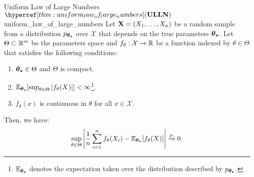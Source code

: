 \begin{theorem}{Uniform Law of Large Numbers $\ULLN$}{uniform_law_of_large_numbers}
    Let ${\bf X}=(X_1, \dots, X_n)$ be a random sample from a distribution $p_{\boldsymbol{\theta_*}}$ over $\mathcal{X}$ that depends on the true parameters $\boldsymbol{\theta_*}$. Let $\Theta\subset\mathbb{R}^m$ be the parameters space and $f_\theta:\mathcal{X}\to\mathbb{R}$ be a function indexed by $\theta\in\Theta$ that satisfies the following conditions:
    \begin{enumerate}
        \item $\boldsymbol{\theta_*}\in\Theta$ and $\Theta$ is compact.
        \item $\mathbb{E}_{\boldsymbol{\theta_*}}[\sup_{\theta\in\Theta}|f_\theta(X)|] < \infty$\footnote{$\mathbb{E}_{\boldsymbol{\theta_*}}$ denotes the expectation taken over the distribution described by $p_{\boldsymbol{\theta_*}}$.}.
        \item $f_\theta(x)$ is continuous in $\theta$ for all $x\in\mathcal{X}$.
    \end{enumerate}

    \noindent Then, we have:
    \begin{equation}
        \sup_{\theta\in\Theta}\Bigg| 
            \frac{1}{n}\sum_{i=1}^n f_\theta(X_i) - \mathbb{E}_{\boldsymbol{\theta_*}}[f_\theta(X)]
         \Bigg| \xrightarrow{p} 0.
    \end{equation}
\end{theorem} 

